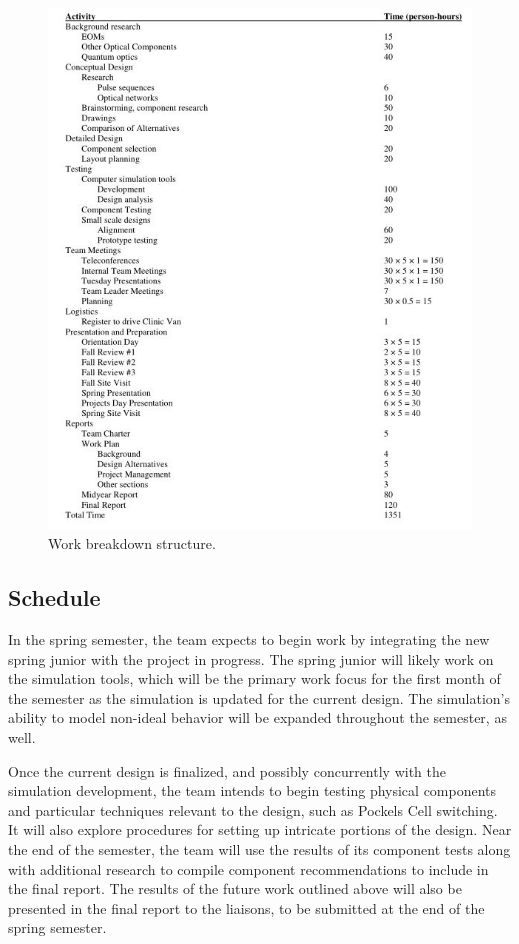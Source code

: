 \documentclass[pdftex,12pt,a4paper]{article}
\begin{document}
\begin{figure}
\centering
\includegraphics[scale=1.25]{workBreakdown.JPG}
\caption{Work breakdown structure.}
\label{fig:WorkBreakDown}
\end{figure}

\subsection{Schedule}
In the spring semester, the team expects to begin work by integrating the new spring junior with the project in progress. The spring junior will likely work on the simulation tools, which will be the primary work focus for the first month of the semester as the simulation is updated for the current design. The simulation's ability to model non-ideal behavior will be expanded throughout the semester, as well.

Once the current design is finalized, and possibly concurrently with the simulation development, the team intends to begin testing physical components and particular techniques relevant to the design, such as Pockels Cell switching. It will also explore procedures for setting up intricate portions of the design. Near the end of the semester, the team will use the results of its component tests along with additional research to compile component recommendations to include in the final report. The results of the future work outlined above will also be presented in the final report to the liaisons, to be submitted at the end of the spring semester.


\newpage



\end{document}
